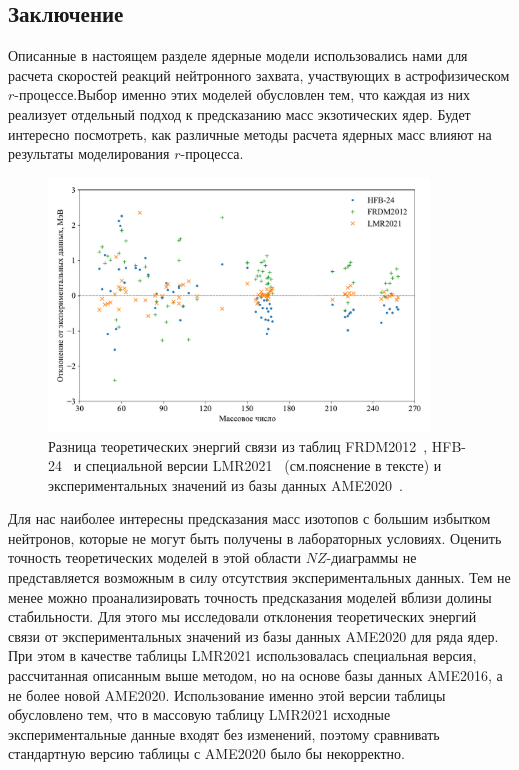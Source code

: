 



\subsection{Заключение}
Описанные в настоящем разделе ядерные модели использовались нами для расчета скоростей реакций нейтронного захвата, участвующих в астрофизическом $r$-процессе.Выбор именно этих моделей обусловлен тем, что каждая из них реализует отдельный подход к предсказанию масс экзотических ядер. Будет интересно посмотреть, как различные методы расчета ядерных масс влияют на результаты моделирования $r$-процесса.

\begin{figure}
  \centering
  \includegraphics[width=0.9\textwidth]{pics/deviations.pdf}
  \caption{Разница теоретических энергий связи из таблиц FRDM2012~\cite{moller2016}, HFB-24~\cite{goriely2013} и специальной версии LMR2021~\cite{vladimirova2022} (см.пояснение в тексте) и экспериментальных значений из базы данных AME2020~\cite{huang2021}.}
  \label{fig:deviations}
\end{figure}

Для нас наиболее интересны предсказания масс изотопов с большим избытком нейтронов, которые не могут быть получены в лабораторных условиях. Оценить точность теоретических моделей в этой области $NZ$-диаграммы не представляется возможным в силу отсутствия экспериментальных данных. Тем не менее можно проанализировать точность предсказания моделей вблизи долины стабильности. Для этого мы исследовали отклонения теоретических энергий связи от экспериментальных значений из базы данных AME2020 для ряда ядер. При этом в качестве таблицы LMR2021 использовалась специальная версия, рассчитанная описанным выше методом, но на основе базы данных AME2016, а не более новой AME2020. Использование именно этой версии таблицы обусловлено тем, что в массовую таблицу LMR2021 исходные экспериментальные данные входят без изменений, поэтому сравнивать стандартную версию таблицы с AME2020 было бы некорректно.

